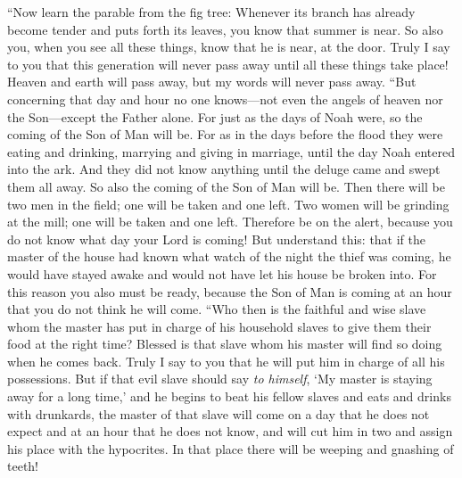 \begin{biblechapter}
 “Now learn the parable from the fig tree: Whenever its branch has already become tender and puts forth its leaves, you know that summer is near.
\verse So also you, when you see all these things, know that he is near, at the door.
\verse Truly I say to you that this generation will never pass away until all these things take place!
\verse Heaven and earth will pass away, but my words will never pass away.
 “But concerning that day and hour no one knows—not even the angels of heaven nor the Son—except the Father alone.
\verse For just as the days of Noah were, so the coming of the Son of Man will be.
\verse For as in the days before the flood they were eating and drinking, marrying and giving in marriage, until the day Noah entered into the ark.
\verse And they did not know anything until the deluge came and swept them all away. So also the coming of the Son of Man will be.
\verse Then there will be two men in the field; one will be taken and one left.
\verse Two women will be grinding at the mill; one will be taken and one left.
\verse Therefore be on the alert, because you do not know what day your Lord is coming!
\verse But understand this: that if the master of the house had known what watch of the night the thief was coming, he would have stayed awake and would not have let his house be broken into.
\verse For this reason you also must be ready, because the Son of Man is coming at an hour that you do not think he will come.
 “Who then is the faithful and wise slave whom the master has put in charge of his household slaves to give them their food at the right time?
\verse Blessed is that slave whom his master will find so doing when he comes back.
\verse Truly I say to you that he will put him in charge of all his possessions.
\verse But if that evil slave should say \textit{to himself}, ‘My master is staying away for a long time,’
\verse and he begins to beat his fellow slaves and eats and drinks with drunkards,
\verse the master of that slave will come on a day that he does not expect and at an hour that he does not know,
\verse and will cut him in two and assign his place with the hypocrites. In that place there will be weeping and gnashing of teeth!
\end{biblechapter}

